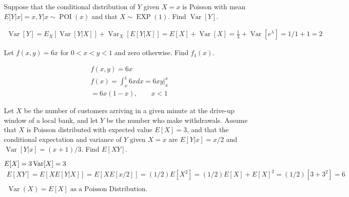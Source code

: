 \documentclass[answers]{exam}
\begin{document}
\begin{questions}
\question 
Suppose that the conditional distribution of $Y$ given $X=x$ is Poisson with mean 
\(E[Y|x] = x , Y|x\sim\operatorname{POI}(x)\) and that \(X\sim\operatorname{EXP}(1)\). Find \(\operatorname{Var}[Y]\).
\begin{solution}
	\begin{align*}
		\operatorname{Var}[Y] 
		= E_X[\operatorname{Var}[Y|X]] + \operatorname{Var}_X[E[Y|X]]
		= E[X] + \operatorname{Var}[X]
		= \frac{1}{\lambda} + \operatorname{Var}[e^\lambda]
		= 1/1 + 1 = 2
	\end{align*}
\end{solution}

\question 
Let \(f(x,y) = 6x\) for \(0<x<y<1\) and zero otherwise. Find \(f_1(x)\).
\begin{solution}
	\begin{align*}
		& f(x,y) = 6x \\
		& f(x) = \int_{x}^{1} 6x dx = \left. 6xy \right|_x^x \\ 
		&= 6x(1-x), \hspace{2em} x<1 
	\end{align*}
\end{solution}

\question 
Let $X$ be the number of customers arriving in a given minute at the drive-up window of a local bank, and let $Y$ be the number who make withdrawals. Assume that $X$ is Poisson distributed with expected value \(E[X]=3\), and that the conditional expectation and variance of $Y$ given \(X=x\) are \(E[Y|x] = x/2\) and \(\operatorname{Var}[Y|x]=(x+1)/3\). Find \(E[XY]\).
\begin{solution}
	\(E[X]=3 \vspace{2em} \operatorname{Var}[X] = 3\)
	\begin{align*}
		E[XY] = E[X E[Y|X]] = E[XE[x/2]] = (1/2)E[X^2] = (1/2)E[X]+E[X]^2 = (1/2)[3+3^2] = 6 \\
		\\
		\operatorname{Var}(X) = E[X] \text{ as a Poisson Distribution.}
	\end{align*}
\end{solution}


\end{questions}
\end{document}
